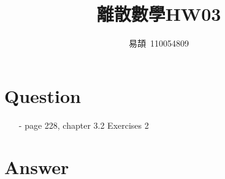 \documentclass[sigconf]{acmart}
\begin{document}
\title{離散數學HW03}

\author{易頡~110054809}
\orcid{}

\maketitle

\section{Question}
\begin{itemize}
	\item[-] page 228, chapter 3.2 Exercises 2
\end{itemize}

\section{Answer}
\begin{comment}
\subsection{page 214, chapter 3.1 Exercises 24}
\begin{shaded}
    Describe an algorithm that determines whether a function from a finite set to another finite set is one-to-one.
\end{shaded}
\begin{algorithm}[H]
    \algsetup{linenosize=\tiny}
    \scriptsize
    \begin{algorithmic}[1]
        \FOR{$i : = 1$ to $m$}
        \STATE {$hit(b_i) := 0$}
        \ENDFOR
        \STATE {$one\_one := \mathbf{true}$}
        \FOR{$j : = 1$ to $n$}
        \IF{$hit(f(a_j)) = 0$}
        \STATE {$hit( f(a_j) ) := $ \underline{~~請作答~~}}
        \ELSE
        \STATE{$one\_one := \underline{~~請作答~~}$}
        \ENDIF
        \ENDFOR
        \RETURN \underline{~~請作答~~}
    \end{algorithmic}
    \caption{\footnotesize \newline procedure $one\_one$($f$ : function,$a_1,a_2,...,a_n,b_1,b_2,...,b_m$): integers)}
    \label{alg:seq}
\end{algorithm}
\end{comment} 
\end{document}
